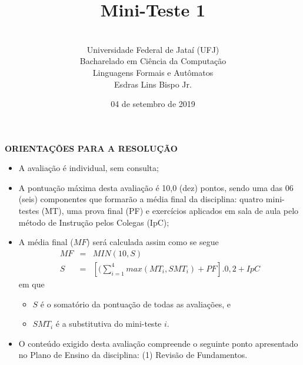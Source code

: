 \documentclass[12pt,a4paper,oneside]{article}
\author{\\Universidade Federal de Jataí (UFJ)\\Bacharelado em Ciência da Computação \\Linguagens Formais e Autômatos \\Esdras Lins Bispo Jr.}
\date{04 de setembro de 2019}
\title{\sc \huge Mini-Teste 1}
\begin{document}
\maketitle

{\bf ORIENTAÇÕES PARA A RESOLUÇÃO}

\small
 
\begin{itemize}
	\item A avaliação é individual, sem consulta;
	\item A pontuação máxima desta avaliação é 10,0 (dez) pontos, sendo uma das 06 (seis) componentes que formarão a média final da disciplina: quatro mini-testes (MT), uma prova final (PF) e exercícios aplicados em sala de aula pelo método de Instrução pelos Colegas (IpC);
	\item A média final ($MF$) será calculada assim como se segue
	\begin{eqnarray}
		MF & = & MIN(10, S) \nonumber \\
		S & = & [(\sum_{i=1}^{4} max(MT_i, SMT_i ) + PF].0,2  + IpC\nonumber
	\end{eqnarray}
	em que 
	\begin{itemize}
		\item $S$ é o somatório da pontuação de todas as avaliações, e
		\item $SMT_i$ é a substitutiva do mini-teste $i$.
	\end{itemize}
	\item O conteúdo exigido desta avaliação compreende o seguinte ponto apresentado no Plano de Ensino da disciplina: (1) Revisão de Fundamentos.
\end{itemize}

\begin{center}
\end{center}

\newpage
\end{document}
